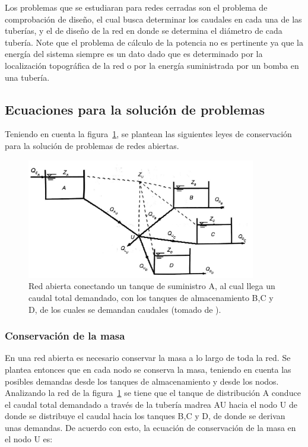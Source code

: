 \documentclass[11pt, oneside]{article}
\begin{document}
Los problemas que se estudiaran para redes cerradas son el problema de comprobaci\'on de dise\~no, el cual busca determinar los caudales en cada una de las tuber\'ias, y el de dise\~no de la red en donde se determina el di\'ametro de cada tuber\'ia. Note que el problema de c\'alculo de la potencia no es pertinente ya que la energ\'ia del sistema siempre es un dato dado que es determinado por la localizaci\'on topogr\'afica de la red o por la energ\'ia suministrada por un bomba en una tuber\'ia. 

\subsection{Ecuaciones para la soluci\'on de problemas}
Teniendo en cuenta la figura~\ref{opn2}, se plantean las siguientes leyes de conservaci\'on para la soluci\'on de problemas de redes abiertas.

\begin{figure}[h]
\centering
\includegraphics[width=10cm]{./figs/opn2.jpeg}
\caption{Red abierta conectando un tanque de suministro A, al cual llega un caudal total demandado, con los tanques de almacenamiento B,C y D, de los cuales se demandan caudales (tomado de \cite{saldarriaga}).} 
\label{opn2}
\end{figure}


\subsubsection*{Conservaci\'on de la masa}
En una red abierta es necesario conservar la masa a lo largo de toda la red. Se plantea entonces que en cada nodo se conserva la masa, teniendo en cuenta las posibles demandas desde los tanques de almacenamiento y desde los nodos. Analizando la red de la figura~\ref{opn2} se tiene que el tanque de distribuci\'on A conduce el caudal total demandado a trav\'es de la tuber\'ia madrea AU hacia el nodo U de donde se distribuye el caudal hacia los tanques B,C y D, de donde se derivan unas demandas. De acuerdo con esto, la ecuaci\'on de conservaci\'on de la masa en el nodo U es:
\end{document}
